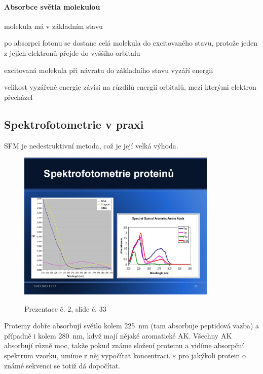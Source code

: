 \documentclass[DIV=8]{scrreprt}
\begin{document}
\paragraph{Absorbce světla molekulou}
\begin{myItemize}[nosep]
    \item molekula má v základním stavu
    \item po absorpci fotonu se dostane celá molekula do excitovaného stavu, protože jeden z jejích elektronů přejde do vyššího orbitalu
    \item excitovaná molekula při návratu do základního stavu vyzáří energii
    \item velikost vyzářené energie závisí na růzdílů energií orbitalů, mezi kterými elektron přecházel
\end{myItemize}



\subsection{Spektrofotometrie v praxi} \label{Spektrofotometrie v praxi}


SFM je nedestruktivní metoda, což je její velká výhoda.

\begin{figure}
    \caption{Prezentace č. 2, slide č. 33}
    \includegraphics[width=0.85\textwidth]{slides-2/slide-33.jpg}
    \centering
    \label{slides-2-slide-33}
\end{figure}

Proteiny dobře absorbují světlo kolem \si{225 nm} (tam absorbuje peptidová vazba) a případně i kolem \si{280 nm}, když mají nějaké aromatické AK. Všechny AK absorbují různě moc, takže pokud známe složení proteinu a vidíme absorpční spektrum vzorku, umíme z něj vypočítat koncentraci. \(\varepsilon\) pro jakýkoli protein o známé sekvenci se totiž dá dopočítat.
\end{document}
